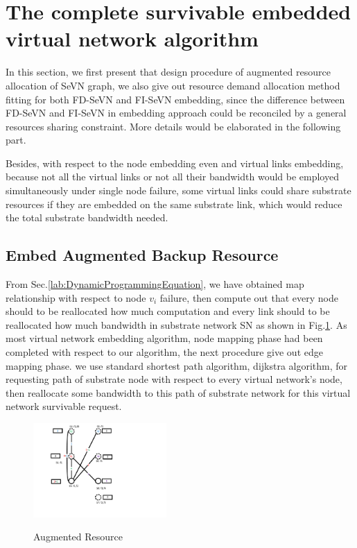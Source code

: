 \section{The complete survivable embedded virtual network algorithm}
In this section, we first present that design procedure of augmented resource allocation  of SeVN graph, we also give out resource demand allocation method fitting for both FD-SeVN and FI-SeVN embedding, since the difference between FD-SeVN and FI-SeVN in embedding approach could be reconciled by a general resources sharing constraint. More details would be elaborated in the following part.

Besides, with respect to the node embedding even and virtual links embedding, because not all the virtual links or not all their bandwidth would be employed simultaneously under single node failure, some virtual links could share substrate resources if they are embedded on the same substrate link, which would reduce the total substrate bandwidth needed.


\subsection{Embed Augmented Backup Resource}
From Sec.\ref{lab:DynamicProgrammingEquation}, we have obtained map relationship with respect to node $v_i$ failure, then compute out that every node should to be reallocated how much computation and every link should to be reallocated how much bandwidth in substrate network SN as shown in Fig.\ref{fig:AugmentResource}. As most virtual network embedding algorithm, node mapping phase had been completed with respect to our algorithm, the next procedure give out edge mapping phase. we use standard shortest path algorithm, dijkstra algorithm, for requesting path of substrate node with respect to every virtual network's node, then reallocate some bandwidth to this path of substrate network for this virtual network survivable request.

\begin{figure}
  \centering
  \includegraphics[width=2in]{Fig/AugmentResource}\\
  \caption{Augmented Resource}\label{fig:AugmentResource}
\end{figure}

